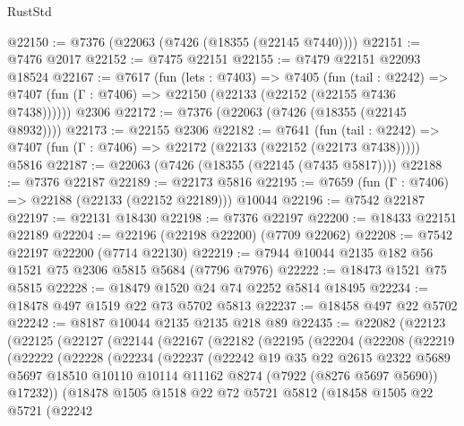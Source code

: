 \begin{lexlean}{RustStd}
\begin{coremodule}
@22150 := @7376 (@22063 (@7426 (@18355 (@22145 @7440))))
@22151 := @7476 @2017
@22152 := @7475 @22151
@22155 := @7479 @22151 @22093 @18524
@22167 := @7617
    (fun (lets : @7403) =>
    @7405
      (fun (tail : @2242) =>
      @7407 (fun (Γ : @7406) => @22150 (@22133 (@22152 (@22155 @7436 @7438))))))
    @2306
@22172 := @7376 (@22063 (@7426 (@18355 (@22145 @8932))))
@22173 := @22155 @2306
@22182 := @7641
    (fun (tail : @2242) => @7407 (fun (Γ : @7406) => @22172 (@22133 (@22152 (@22173 @7438)))))
    @5816
@22187 := @22063 (@7426 (@18355 (@22145 (@7435 @5817))))
@22188 := @7376 @22187
@22189 := @22173 @5816
@22195 := @7659 (fun (Γ : @7406) => @22188 (@22133 (@22152 @22189))) @10044
@22196 := @7542 @22187
@22197 := @22131 @18430
@22198 := @7376 @22197
@22200 := @18433 @22151 @22189
@22204 := @22196 (@22198 @22200) (@7709 @22062)
@22208 := @7542 @22197 @22200 (@7714 @22130)
@22219 := @7944 @10044 @2135 @182 @56 @1521 @75 @2306 @5815 @5684 (@7796 @7976)
@22222 := @18473 @1521 @75 @5815
@22228 := @18479 @1520 @24 @74 @2252 @5814 @18495
@22234 := @18478 @497 @1519 @22 @73 @5702 @5813
@22237 := @18458 @497 @22 @5702
@22242 := @8187 @10044 @2135 @2135 @218 @89
@22435 := @22082
    (@22123
      (@22125
        (@22127
          (@22144
            (@22167
              (@22182
                (@22195
                  (@22204
                    (@22208
                      (@22219
                        (@22222
                          (@22228
                            (@22234
                              (@22237
                                (@22242
                                  @19
                                  @35
                                  @22
                                  @2615
                                  @2322
                                  @5689
                                  @5697
                                  @18510
                                  @10110
                                  @10114
                                  @11162
                                  @8274
                                  (@7922 (@8276 @5697 @5690))
                                  @17232))
                              (@18478
                                @1505
                                @1518
                                @22
                                @72
                                @5721
                                @5812
                                (@18458
                                  @1505
                                  @22
                                  @5721
                                  (@22242

\end{coremodule}
\end{lexlean}
